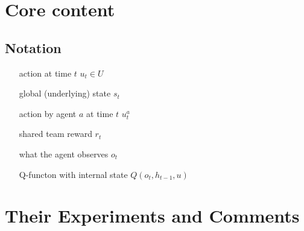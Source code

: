 \documentclass{article}
\begin{document}
    \section{Core content}

    \subsection{Notation}
    \begin{enumerate}
        \item[action at time $t$] $u_t \in U$
        \item[global (underlying) state] $s_t$ 
        \item[action by agent $a$ at time $t$] $u^a_t$
        \item[shared team reward] $r_t$
        \item[what the agent observes] $o_t$
        \item[Q-functon with internal state] $Q(o_t, h_{t-1}, u)$    
    \end{enumerate}


    \section{Their Experiments and Comments}
\end{document}

